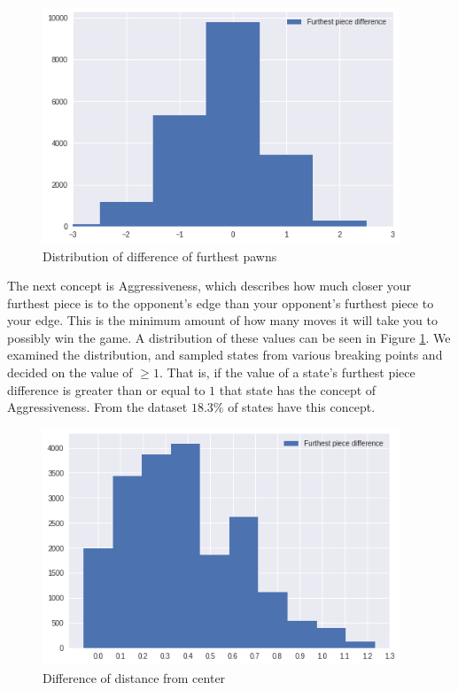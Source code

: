\begin{figure}
    \begin{small}
        \begin{center}
            \includegraphics[width=0.95\textwidth]{graphics/dist_aggressiveness}
        \end{center}
        \caption{Distribution of difference of furthest pawns}
        \label{fig:distaggressiveness}
    \end{small}
\end{figure}

The next concept is Aggressiveness, which describes how much closer your furthest piece is to the opponent's edge than your opponent's furthest piece to your edge. This is the minimum amount of how many moves it will take you to possibly win the game. A distribution of these values can be seen in Figure \ref{fig:distaggressiveness}. We examined the distribution, and sampled states from various breaking points and decided on the value of $\geq 1$. That is, if the value of a state's furthest piece difference is greater than or equal to $1$ that state has the concept of Aggressiveness. From the dataset $18.3\%$ of states have this concept.

\begin{figure}
    \begin{small}
        \begin{center}
            \includegraphics[width=0.95\textwidth]{graphics/dist_unity}
        \end{center}
        \caption{Difference of distance from center}
        \label{fig:distunity}
    \end{small}
\end{figure}

